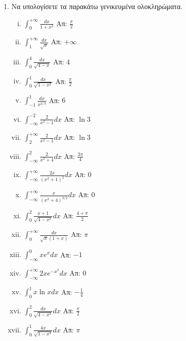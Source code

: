 



\pagestyle{askhseis}
\everymath{\displaystyle}




\begin{center}
  \minibox{\large \bfseries \textcolor{Col1}{Ασκήσεις στα Γενικευμένα Ολοκληρώματα}}
\end{center}

\vspace{\baselineskip}


\begin{enumerate}

\item Να υπολογίσετε τα παρακάτω γενικευμένα ολοκληρώματα.

\begin{enumerate}[i)]
\item $\int_{0}^{+\infty} \frac{dx}{1+x^2}$ \hfill Απ: $\frac{\pi}{2}$
\item $\int_{1}^{+\infty}\frac{dx}{\sqrt{x}}$ \hfill Απ: $+\infty$
\item $\int_{0}^{4}\frac{dx}{\sqrt{4-x}}$ \hfill Απ: $4$
\item $\int_{0}^{1}\frac{dx}{\sqrt{1-x^2}}$ \hfill Απ: $\frac{\pi}{2}$
\item $\int_{-1}^{1}\frac{dx}{x^{2/3}}$ \hfill Απ: $6$
\item $\int_{-\infty}^{-2}\frac{2}{x^2-1}dx$ \hfill Απ: $\ln 3$
\item $\int_{2}^{+\infty}\frac{2}{x^2-1}dx$ \hfill Απ: $\ln 3$
\item $\int_{-\infty}^{2}\frac{2}{x^2+4}dx$ \hfill Απ: $\frac{3\pi}{4}$
\item $\int_{-\infty}^{+\infty}\frac{2x}{(x^2+1)^2}dx$ \hfill Απ: $0$
\item $\int_{-\infty}^{+\infty}\frac{x}{(x^2+4)^{3/2}}dx$ \hfill Απ: $0$
\item $\int_{0}^{2}\frac{x+1}{\sqrt{4-x^2}}dx$ \hfill Απ: $\frac{4+\pi}{2}$
\item $\int_{0}^{+\infty}\frac{dx}{\sqrt{x}(1+x)}$ \hfill Απ: $\pi$
\item $\int_{-\infty}^{0}xe^x dx$ \hfill Απ: $-1$
\item $\int_{-\infty}^{+\infty}2xe^{-x^2}dx$ \hfill Απ: $0$
\item $\int_{0}^{1}x\ln x dx$ \hfill Απ: $-\frac{1}{4}$
\item $\int_{0}^{2}\frac{dx}{\sqrt{4-x^2}}dx$ \hfill Απ: $\frac{\pi}{2}$
\item $\int_{0}^{1}\frac{4x}{\sqrt{1-x^4}}dx$ \hfill Απ: $\pi$
\end{enumerate}
\end{enumerate}






